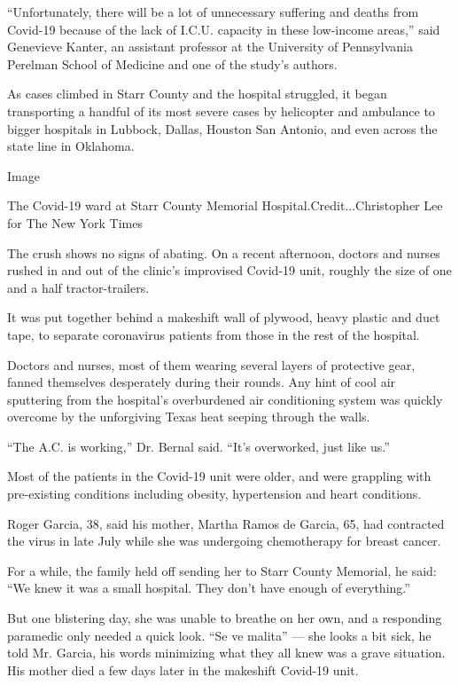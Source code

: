 ``Unfortunately, there will be a lot of unnecessary suffering and deaths
from Covid-19 because of the lack of I.C.U. capacity in these low-income
areas,'' said Genevieve Kanter, an assistant professor at the University
of Pennsylvania Perelman School of Medicine and one of the study's
authors.

As cases climbed in Starr County and the hospital struggled, it began
transporting a handful of its most severe cases by helicopter and
ambulance to bigger hospitals in Lubbock, Dallas, Houston San Antonio,
and even across the state line in Oklahoma.

Image

The Covid-19 ward at Starr County Memorial Hospital.Credit...Christopher
Lee for The New York Times

The crush shows no signs of abating. On a recent afternoon, doctors and
nurses rushed in and out of the clinic's improvised Covid-19 unit,
roughly the size of one and a half tractor-trailers.

It was put together behind a makeshift wall of plywood, heavy plastic
and duct tape, to separate coronavirus patients from those in the rest
of the hospital.

Doctors and nurses, most of them wearing several layers of protective
gear, fanned themselves desperately during their rounds. Any hint of
cool air sputtering from the hospital's overburdened air conditioning
system was quickly overcome by the unforgiving Texas heat seeping
through the walls.

``The A.C. is working,'' Dr. Bernal said. ``It's overworked, just like
us.''

Most of the patients in the Covid-19 unit were older, and were grappling
with pre-existing conditions including obesity, hypertension and heart
conditions.

Roger Garcia, 38, said his mother, Martha Ramos de Garcia, 65, had
contracted the virus in late July while she was undergoing chemotherapy
for breast cancer.

For a while, the family held off sending her to Starr County Memorial,
he said: ``We knew it was a small hospital. They don't have enough of
everything.''

But one blistering day, she was unable to breathe on her own, and a
responding paramedic only needed a quick look. ``Se ve malita'' --- she
looks a bit sick, he told Mr. Garcia, his words minimizing what they all
knew was a grave situation. His mother died a few days later in the
makeshift Covid-19 unit.


